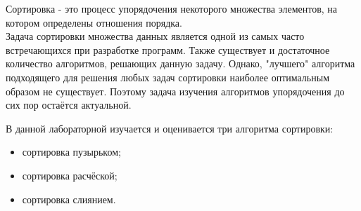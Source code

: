 Сортировка - это процесс упорядочения некоторого множества элементов, на котором определены отношения порядка\cite{sort_def}.\\

Задача сортировки множества данных является одной из самых часто встречающихся при разработке программ. Также существует и достаточное количество алгоритмов, решающих данную задачу. Однако, "лучшего" алгоритма подходящего для решения любых задач сортировки наиболее оптимальным образом не существует. Поэтому задача изучения алгоритмов упорядочения до сих пор остаётся актуальной.

В данной лабораторной изучается и оценивается три алгоритма сортировки:
\begin{itemize}
	\item сортировка пузырьком;
	\item сортировка расчёской;
	\item сортировка слиянием.
\end{itemize}
